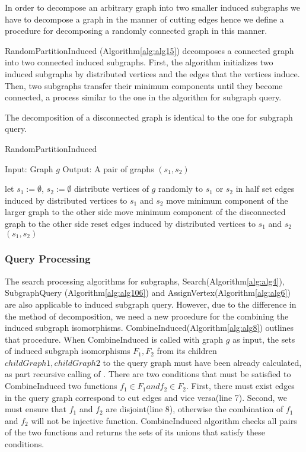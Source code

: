 In order to decompose an arbitrary graph into two smaller induced subgraphs we have to decompose a graph in the manner of cutting edges
hence we define a procedure for decomposing a randomly connected graph in this manner.

RandomPartitionInduced (Algorithm\ref{alg:alg15}) decomposes a connected graph into two connected induced subgraphs.
First, the algorithm initializes two induced subgraphs by distributed vertices and the edges that the vertices induce.
Then, two subgraphs transfer their minimum components until they become connected, a process similar to the one in the 
algorithm for subgraph query.

The decomposition of a disconnected graph is identical to the one for subgraph query.

\begin{algorithm}
\caption{RandomPartitionInduced}
\label{alg:alg15}
\begin{algorithmic}
\STATE Input: Graph $g$
\STATE Output: A pair of graphs $(s_1, s_2)$
\end{algorithmic}
\begin{algorithmic}[1]
\STATE let $s_1 := \emptyset$, $s_2 := \emptyset$
\STATE distribute vertices of $g$ randomly to $s_1$ or $s_2$ in half
\STATE set edges induced by distributed vertices to $s_1$ and $s_2$ 
\REPEAT
		\STATE move minimum component of the larger graph to the other side
	\ELSE
		\STATE move minimum component of the disconnected graph to the other side
	\ENDIF
	\STATE reset edges induced by distributed vertices to $s_1$ and $s_2$ 
\RETURN $(s_1,s_2)$
\end{algorithmic}
\end{algorithm}

\subsubsection{Query Processing}
The search processing algorithms for subgraphs, Search(Algorithm\ref{alg:alg4}), SubgraphQuery (Algorithm\ref{alg:alg106}) and AssignVertex(Algorithm\ref{alg:alg6}) 
are also applicable to induced subgraph query. However, due to the difference in the method of decomposition, we need a new procedure for the combining the 
induced subgraph isomorphisms. CombineInduced(Algorithm\ref{alg:alg8}) outlines that procedure.
When CombineInduced is called with graph $g$ as input, the sets of induced subgraph isomorphisms $F_1, F_2$ from its children $childGraph1, childGraph2$ 
to the query graph must have been already calculated, as part recursive calling of \label{alg:alg106}.
There are two conditions that must be satisfied to CombineInduced two functions $f_1 \in F_1 and f_2 \in F_2$.
First, there must exist edges in the query graph correspond to cut edges and vice versa(line 7).
Second, we must ensure that $f_1$ and $f_2$ are disjoint(line 8), otherwise the combination of $f_1$ and $f_2$ will not be injective function.
CombineInduced algorithm checks all pairs of the two functions and returns the sets of its unions that satisfy these conditions.

